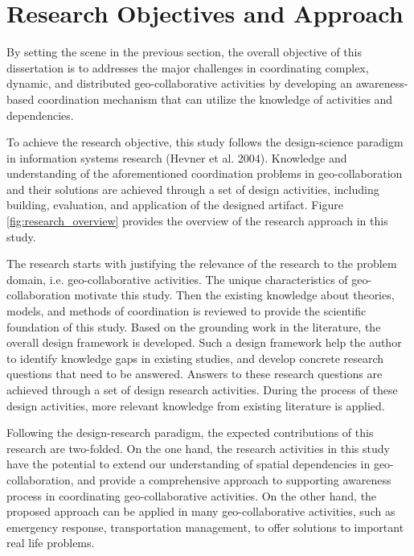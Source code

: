 \section{Research Objectives and Approach} %
\label{sec:research_objectives}
By setting the scene in the previous section, the overall objective of this dissertation is to addresses the major challenges in coordinating complex, dynamic, and distributed geo-collaborative activities by developing an awareness-based coordination mechanism that can utilize the knowledge of activities and dependencies.

To achieve the research objective, this study follows the design-science paradigm in information systems research (Hevner et al. 2004). Knowledge and understanding of the aforementioned coordination problems in geo-collaboration and their solutions are achieved through a set of design activities, including building, evaluation, and application of the designed artifact. Figure \ref{fig:research_overview} provides the overview of the research approach in this study.

The research starts with justifying the relevance of the research to the problem domain, i.e. geo-collaborative activities. The unique characteristics of geo-collaboration motivate this study. Then the existing knowledge about theories, models, and methods of coordination is reviewed to provide the scientific foundation of this study. Based on the grounding work in the literature, the overall design framework is developed. Such a design framework help the author to identify knowledge gaps in existing studies, and develop concrete research questions that need to be answered. Answers to these research questions are achieved through a set of design research activities. During the process of these design activities, more relevant knowledge from existing literature is applied.

Following the design-research paradigm, the expected contributions of this research are two-folded. On the one hand, the research activities in this study have the potential to extend our understanding of spatial dependencies in geo-collaboration, and provide a comprehensive approach to supporting awareness process in coordinating geo-collaborative activities. On the other hand, the proposed approach can be applied in many geo-collaborative activities, such as emergency response, transportation management, to offer solutions to important real life problems.

